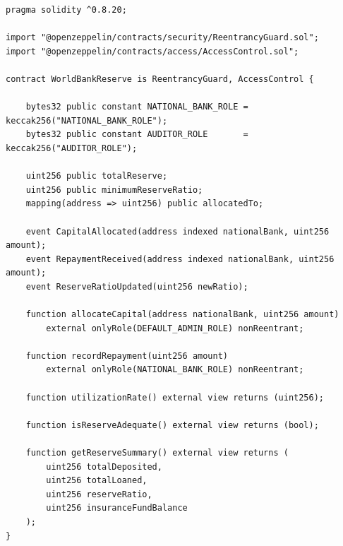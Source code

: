 \documentclass[12pt,a4paper]{report}
\begin{document}
\begin{lstlisting}[language=Solidity,basicstyle=\ttfamily\scriptsize,breaklines=true,
    commentstyle=\color{GrayText},keywordstyle=\color{PrimaryBlue}\bfseries,
    frame=single,rulecolor=\color{AccentBlue!40},captionpos=b,
    caption={WorldBankReserve.sol -- Tier 1 public interface. Full implementation in project repository.}]
pragma solidity ^0.8.20;

import "@openzeppelin/contracts/security/ReentrancyGuard.sol";
import "@openzeppelin/contracts/access/AccessControl.sol";

contract WorldBankReserve is ReentrancyGuard, AccessControl {

    bytes32 public constant NATIONAL_BANK_ROLE = keccak256("NATIONAL_BANK_ROLE");
    bytes32 public constant AUDITOR_ROLE       = keccak256("AUDITOR_ROLE");

    uint256 public totalReserve;
    uint256 public minimumReserveRatio;
    mapping(address => uint256) public allocatedTo;

    event CapitalAllocated(address indexed nationalBank, uint256 amount);
    event RepaymentReceived(address indexed nationalBank, uint256 amount);
    event ReserveRatioUpdated(uint256 newRatio);

    function allocateCapital(address nationalBank, uint256 amount)
        external onlyRole(DEFAULT_ADMIN_ROLE) nonReentrant;

    function recordRepayment(uint256 amount)
        external onlyRole(NATIONAL_BANK_ROLE) nonReentrant;

    function utilizationRate() external view returns (uint256);

    function isReserveAdequate() external view returns (bool);

    function getReserveSummary() external view returns (
        uint256 totalDeposited,
        uint256 totalLoaned,
        uint256 reserveRatio,
        uint256 insuranceFundBalance
    );
}
\end{lstlisting}
\end{document}
